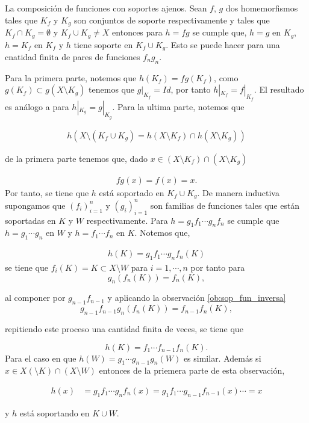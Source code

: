 \begin{ob}\label{ob:efecto_soporte}
La composición de funciones con soportes ajenos. Sean $f$, $g$ dos homemorfismos tales que $K_f$ y $K_g$ son conjuntos de soporte respectivamente y tales que  $K_f \cap K_g = \emptyset$ y $K_f \cup K_g \neq X$ entonces para $h=fg$ se cumple que, $h=g$ en  $ K_g$, $h=K_f$ en $K_f$ y $h$ tiene soporte en $K_f \cup K_g$. Esto se puede hacer para una cnatidad finita de pares de funciones $f_ng_n.$

 Para la primera parte, notemos que  $h(K_f)=fg(K_f)$, como $g(K_f) \subset g(X \setminus K_g)$ tenemos que $g|_{K_f}=Id$, por tanto $h|_{K_f}=f|_{K_f}$. El resultado es análogo a para $h|_{K_g}=g|_{K_g}$. Para la ultima parte, notemos que 
 
\begin{align*}
h( X \setminus (K_f \cup K_g)= h(X \setminus K_f) \cap h(X \setminus K_g))
\end{align*} 

de la primera parte tenemos que, dado $x \in (X \setminus K_f) \cap (X \setminus K_g)$

\begin{align*}
fg(x)= f(x)=x.
\end{align*} 
Por tanto, se tiene que $h$ está soportado en $K_f \cup K_g.$ De manera inductiva supongamos que $(f_i)_{i = 1}^n$ y $(g_i)_{i = 1}^n$ son familias de funciones tales que están soportadas en $K$ y $W$ respectivamente. Para $h = g_1f_1 \cdots g_n f_n$ se cumple que $h= g_1 \cdots g_n$ en $W$ y $h=f_1 \cdots f_n$ en $K.$ Notemos que, 
 
\begin{align*}
h(K)= g_1f_1 \cdots g_n f_n(K)
\end{align*}
 se tiene que $f_i(K)= K \subset X \setminus W$ para $i = 1 , \cdots ,n$ por tanto para $$g_n(f_n(K))=f_n(K),$$
 
 al componer por $g_{n-1}f_{n-1}$ y  aplicando la observación \ref{ob:sop_fun_inversa}
 $$g_{n-1}f_{n-1}g_n(f_n(K))=f_{n-1}f_n(K),$$

repitiendo este proceso una cantidad finita de veces, se tiene que

 $$h(K)=f_1 \cdots f_{n-1}f_n(K).$$
Para el caso en que $h(W)= g_1 \cdots g_{n-1}g_n(W)$ es similar.  Además si $x \in X (\setminus K) \cap (X \setminus W)$ entonces de la priemera parte de esta observación,

\begin{align*}
h(x) & = g_1f_1 \cdots g_n f_n(x) = g_1f_1 \cdots g_{n-1 }f_{n-1}(x) \cdots = x
\end{align*}

y $h$ está soportando en $K \cup W.$
\end{ob}
 
